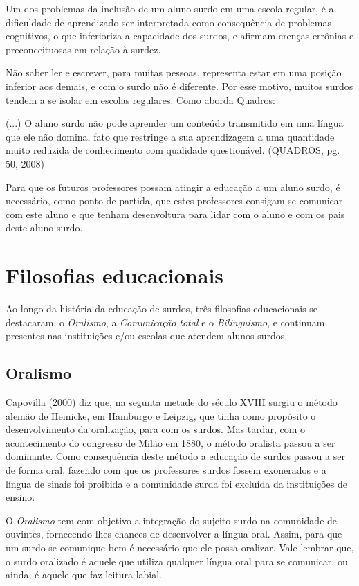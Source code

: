 \documentclass[brasil]{abnt}
\begin{document}
	Um dos problemas da inclusão de um aluno surdo em uma escola regular, é a dificuldade de aprendizado ser interpretada como consequência de problemas cognitivos, o que inferioriza
	a capacidade dos surdos, e afirmam crenças errônias e preconceituosas em relação à surdez.  	
	
	Não saber ler e escrever, para muitas pessoas, representa estar em uma posição inferior aos demais, e com o surdo não é diferente. Por esse motivo, muitos surdos tendem a se isolar em
	escolas regulares. Como aborda Quadros:
	
		\begin{citacao}(...) O aluno surdo não pode aprender um conteúdo transmitido em uma língua que ele não domina, fato que restringe a sua aprendizagem a uma quantidade muito reduzida
						de conhecimento com qualidade questionável. (QUADROS, pg. 50, 2008)		
		\end{citacao}
	
	Para que os futuros professores possam atingir a educação a um aluno surdo, é necessário, como ponto de partida, que estes professores consigam se comunicar com este aluno e que tenham desenvoltura 
	para lidar com o aluno e com os pais deste aluno surdo.

	\section{Filosofias educacionais}
		Ao longo da história da educação de surdos, três filosofias educacionais se destacaram, o \textit{Oralismo}, a \textit{Comunicação total} e o \textit{Bilinguismo}, e continuam presentes 
		nas instituições e/ou escolas que atendem alunos surdos.
		
		\subsection{Oralismo}
		 Capovilla (2000) diz que, na segunta metade do século XVIII surgiu o método alemão de Heinicke, em Hamburgo e Leipzig, que tinha como propósito o desenvolvimento da oralização, para com os surdos. Mas tardar, com o
		 acontecimento do congresso de Milão em 1880, o método oralista passou a ser dominante. Como consequência deste método a educação de surdos passou a ser de forma oral, fazendo com que os 
		 professores surdos fossem exonerados e a língua de sinais foi proibida e a comunidade surda foi excluída da instituições de ensino. 
		 
		 O \textit{Oralismo} tem com objetivo a integração do sujeito surdo na comunidade de ouvintes, fornecendo-lhes chances de desenvolver a língua oral. Assim, para que um surdo se comunique bem é necessário que ele possa oralizar.
		 Vale lembrar que, o surdo oralizado é aquele que utiliza qualquer língua oral para se comunicar, ou ainda, é aquele que faz leitura labial.
		 
\end{document}
